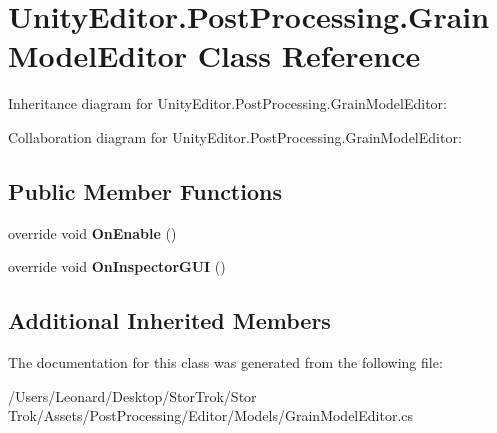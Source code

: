 \hypertarget{class_unity_editor_1_1_post_processing_1_1_grain_model_editor}{}\section{Unity\+Editor.\+Post\+Processing.\+Grain\+Model\+Editor Class Reference}
\label{class_unity_editor_1_1_post_processing_1_1_grain_model_editor}


Inheritance diagram for Unity\+Editor.\+Post\+Processing.\+Grain\+Model\+Editor\+:


Collaboration diagram for Unity\+Editor.\+Post\+Processing.\+Grain\+Model\+Editor\+:
\subsection*{Public Member Functions}
\begin{DoxyCompactItemize}
\item 
\mbox{\label{class_unity_editor_1_1_post_processing_1_1_grain_model_editor_aecebb5c4de2fcd7df84dfa52ca8f6e4d}} 
override void {\bfseries On\+Enable} ()
\item 
\mbox{\label{class_unity_editor_1_1_post_processing_1_1_grain_model_editor_a89570fe2538ade6f875dac77284e76c4}} 
override void {\bfseries On\+Inspector\+G\+UI} ()
\end{DoxyCompactItemize}
\subsection*{Additional Inherited Members}


The documentation for this class was generated from the following file\+:\begin{DoxyCompactItemize}
\item 
/\+Users/\+Leonard/\+Desktop/\+Stor\+Trok/\+Stor Trok/\+Assets/\+Post\+Processing/\+Editor/\+Models/Grain\+Model\+Editor.\+cs\end{DoxyCompactItemize}
